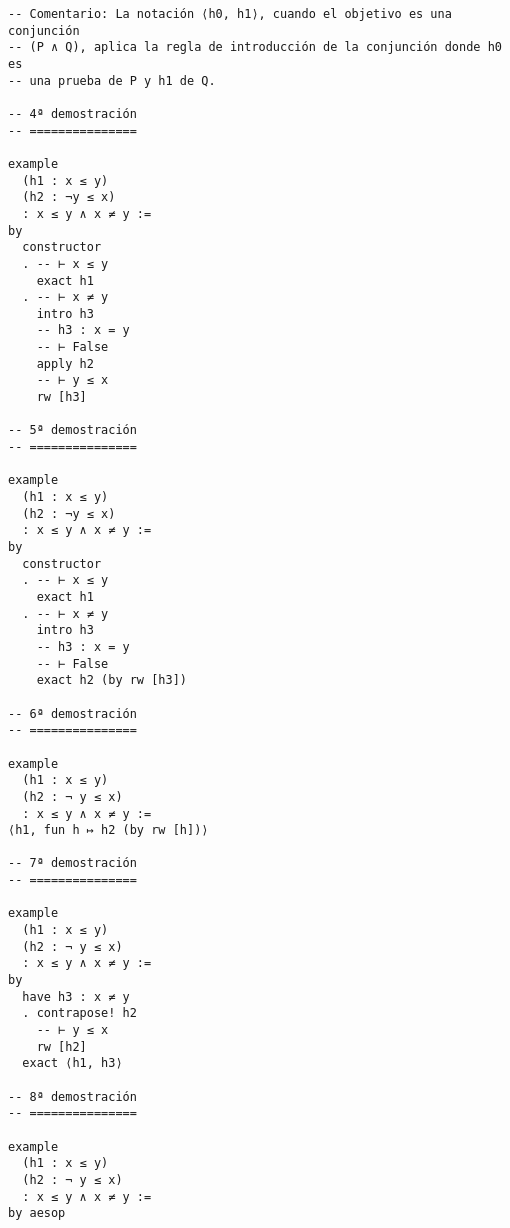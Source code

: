 \begin{verbatim}
-- Comentario: La notación ⟨h0, h1⟩, cuando el objetivo es una conjunción
-- (P ∧ Q), aplica la regla de introducción de la conjunción donde h0 es
-- una prueba de P y h1 de Q.

-- 4ª demostración
-- ===============

example
  (h1 : x ≤ y)
  (h2 : ¬y ≤ x)
  : x ≤ y ∧ x ≠ y :=
by
  constructor
  . -- ⊢ x ≤ y
    exact h1
  . -- ⊢ x ≠ y
    intro h3
    -- h3 : x = y
    -- ⊢ False
    apply h2
    -- ⊢ y ≤ x
    rw [h3]

-- 5ª demostración
-- ===============

example
  (h1 : x ≤ y)
  (h2 : ¬y ≤ x)
  : x ≤ y ∧ x ≠ y :=
by
  constructor
  . -- ⊢ x ≤ y
    exact h1
  . -- ⊢ x ≠ y
    intro h3
    -- h3 : x = y
    -- ⊢ False
    exact h2 (by rw [h3])

-- 6ª demostración
-- ===============

example
  (h1 : x ≤ y)
  (h2 : ¬ y ≤ x)
  : x ≤ y ∧ x ≠ y :=
⟨h1, fun h ↦ h2 (by rw [h])⟩

-- 7ª demostración
-- ===============

example
  (h1 : x ≤ y)
  (h2 : ¬ y ≤ x)
  : x ≤ y ∧ x ≠ y :=
by
  have h3 : x ≠ y
  . contrapose! h2
    -- ⊢ y ≤ x
    rw [h2]
  exact ⟨h1, h3⟩

-- 8ª demostración
-- ===============

example
  (h1 : x ≤ y)
  (h2 : ¬ y ≤ x)
  : x ≤ y ∧ x ≠ y :=
by aesop
\end{verbatim}


